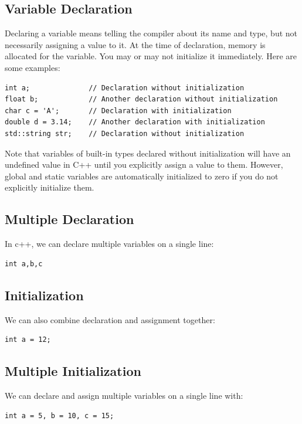 \documentclass{report}
\begin{document}
    \subsection{Variable Declaration}
    \bigbreak \noindent 
    Declaring a variable means telling the compiler about its name and type, but not necessarily assigning a value to it. At the time of declaration, memory is allocated for the variable. You may or may not initialize it immediately. Here are some examples:
    \bigbreak \noindent 
    \sepline
    \begin{verbatim}
int a;              // Declaration without initialization
float b;            // Another declaration without initialization
char c = 'A';       // Declaration with initialization
double d = 3.14;    // Another declaration with initialization
std::string str;    // Declaration without initialization
    \end{verbatim}
    \sepline
    \bigbreak \noindent 
    Note that variables of built-in types declared without initialization will have an undefined value in C++ until you explicitly assign a value to them. However, global and static variables are automatically initialized to zero if you do not explicitly initialize them.

    \bigbreak \noindent 
    \subsection{Multiple Declaration}
    \bigbreak \noindent 
    In c++, we can declare multiple variables on a single line:
    \bigbreak \noindent 
    \sepline
    \begin{verbatim}
int a,b,c
    \end{verbatim}
    \sepline

    \bigbreak \noindent 
    \subsection{Initialization}
    \bigbreak \noindent 
    We can also combine declaration and assignment together:
    \bigbreak \noindent 
    \sepline
    \begin{verbatim}
int a = 12;
    \end{verbatim}
    \sepline

    \bigbreak \noindent 
    \subsection{Multiple Initialization}
    \bigbreak \noindent 
    We can declare and assign multiple variables on a single line with:
    \bigbreak \noindent 
    \sepline
    \begin{verbatim}
int a = 5, b = 10, c = 15;
    \end{verbatim}
    \sepline
\end{document}
